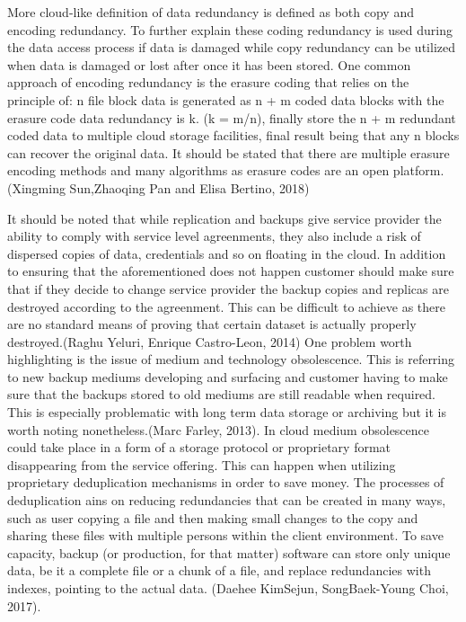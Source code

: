 \documentclass{article}
\begin{document}
\par
More cloud-like definition of data redundancy is defined as both copy and encoding redundancy. To further explain these coding redundancy is used during the data access process if data is damaged while copy redundancy can be utilized when data is damaged or lost after once it has been stored. One common approach of encoding redundancy is the erasure coding that relies on the principle of: n file block data is generated as n + m coded data blocks with the erasure code data redundancy is k. (k = m/n), finally store the n + m redundant coded data to multiple cloud storage facilities, final result being that any n blocks can recover the original data. It should be stated that there are multiple erasure encoding methods and many algorithms as erasure codes are an open platform. (Xingming Sun,Zhaoqing Pan and Elisa Bertino, 2018)
\par
It should be noted that while replication and backups give service provider the ability to comply with service level agreenments, they also include a risk of dispersed copies of data, credentials and so on floating in the cloud. In addition to ensuring that the aforementioned does not happen customer should make sure that if they decide to change service provider the backup copies and replicas are destroyed according to the agreenment. This can be difficult to achieve as there are no standard means of proving that certain dataset is actually properly destroyed.(Raghu Yeluri, Enrique Castro-Leon, 2014)
One problem worth highlighting is the issue of medium and technology obsolescence. This is referring to new backup mediums developing and surfacing and customer having to make sure that the backups stored to old mediums are still readable when required. This is especially problematic with long term data storage or archiving but it is worth noting nonetheless.(Marc Farley, 2013). In cloud medium obsolescence could take place in a form of a storage protocol or proprietary format disappearing from the service offering.
This can happen when utilizing proprietary deduplication mechanisms in order to save money. The processes of deduplication ains on reducing redundancies that can be created in many ways, such as user copying a file and then making small changes to the copy and sharing these files with multiple persons within the client environment. To save capacity, backup (or production, for that matter) software can store only unique data, be it a complete file or a chunk of a file,  and replace redundancies with indexes, pointing to the actual data. (Daehee KimSejun, SongBaek-Young Choi, 2017).
\end{document}
